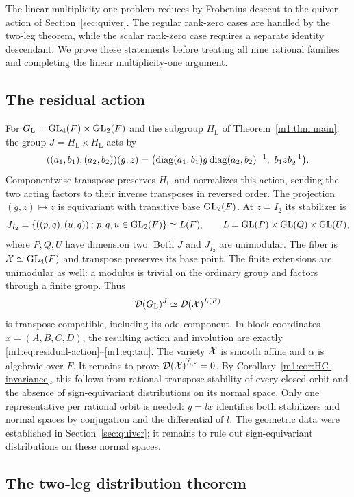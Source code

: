 The linear multiplicity-one problem reduces by Frobenius descent to the quiver
action of Section~\ref{sec:quiver}. The regular rank-zero cases
are handled by the two-leg theorem, while the scalar rank-zero
case requires a separate identity descendant. We prove these statements before treating all nine rational families
and completing the linear multiplicity-one argument.

\subsection{The residual action}\label{m1:subsec:reduction-to-GL4}
For $G_{\mathrm L}=\operatorname{GL}_4(F)\times\operatorname{GL}_2(F)$ and the subgroup $H_{\mathrm L}$
of Theorem~\ref{m1:thm:main}, the group $J=H_{\mathrm L}\times H_{\mathrm L}$ acts by
\[
 ((a_1,b_1),(a_2,b_2))(g,z)
 =\bigl(\operatorname{diag}(a_1,b_1)g\operatorname{diag}(a_2,b_2)^{-1},\ b_1zb_2^{-1}\bigr).
\]
Componentwise transpose preserves $H_{\mathrm L}$ and normalizes this action, sending
the two acting factors to their inverse transposes in reversed order.
The projection $(g,z)\mapsto z$ is equivariant with transitive base
$\operatorname{GL}_2(F)$. At $z=I_2$ its stabilizer is
\[
 J_{I_2}=\{((p,q),(u,q)):p,q,u\in\operatorname{GL}_2(F)\}
 \simeq L(F),\qquad L=\operatorname{GL}(P)\times\operatorname{GL}(Q)\times\operatorname{GL}(U),
\]
where $P,Q,U$ have dimension two. Both $J$ and $J_{I_2}$ are unimodular.
The fiber is $\mathcal X\simeq\operatorname{GL}_4(F)$ and transpose preserves its base point.
The finite extensions are unimodular as well: a modulus is trivial on
the ordinary group and factors through a finite group. Thus
\begin{equation}\label{m1:eq:residual-Frobenius}
 \mathcal D(G_{\mathrm L})^J\simeq\mathcal D(\mathcal X)^{L(F)}
\end{equation}
is transpose-compatible, including its odd component. In block
coordinates $x=(A,B,C,D)$, the resulting action and involution are
exactly \eqref{m1:eq:residual-action}--\eqref{m1:eq:tau}.
The variety $\mathcal X$ is smooth affine and $\alpha$ is algebraic over $F$.
It remains to prove $\mathcal D(\mathcal X)^{\widetilde L,\varepsilon}=0$.
By Corollary~\ref{m1:cor:HC-invariance}, this follows from rational transpose
stability of every closed orbit and the absence of sign-equivariant
distributions on its normal space.
Only one representative per rational orbit is needed: $y=l x$ identifies
both stabilizers and normal spaces by conjugation and the differential of
$l$. The geometric data were established in Section~\ref{sec:quiver};
it remains to rule out sign-equivariant distributions on these normal spaces.

\subsection{The two-leg distribution theorem}\label{m1:sec:two-leg}

